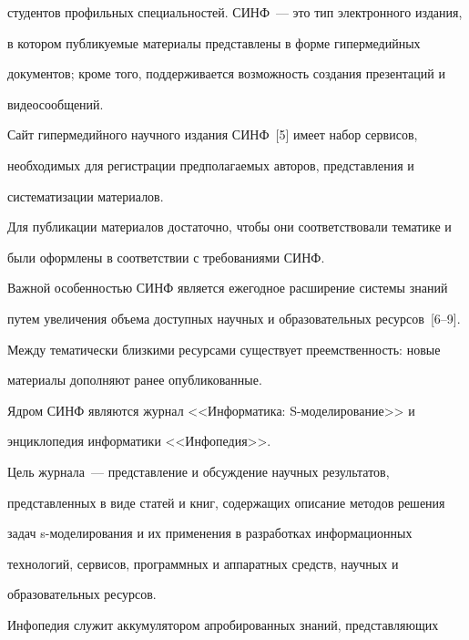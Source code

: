 студентов профильных специальностей. СИНФ~--- это тип электронного издания,


в котором публикуемые материалы представлены в форме гипермедийных


документов; кроме того, поддерживается возможность создания презентаций и


видеосообщений.





  Сайт гипермедийного научного издания СИНФ~[5] имеет набор сервисов,


необходимых для регистрации предполагаемых авторов, представления и


систематизации материалов.





  Для публикации материалов достаточно, чтобы они соответствовали тематике и


были оформлены в соответствии с требованиями СИНФ.





  Важной особенностью СИНФ является ежегодное расширение системы знаний


путем увеличения объема доступных научных и образовательных ресурсов~[6--9].


Между тематически близкими ресурсами существует преемственность: новые


материалы дополняют ранее опубликованные.





  Ядром СИНФ являются журнал <<Информатика: S-мо\-де\-ли\-ро\-ва\-ние>> и


эн\-цик\-ло\-пе\-дия информатики <<Инфопедия>>.





  Цель журнала~--- представление и обсуждение научных результатов,


представленных в виде статей и книг, содержащих описание методов решения


задач s-мо\-де\-ли\-ро\-ва\-ния и их применения в разработках информационных


технологий, сервисов, программных и аппаратных средств, научных и


образовательных ресурсов.





  Инфопедия служит аккумулятором апробированных знаний, пред\-став\-ля\-ющих


